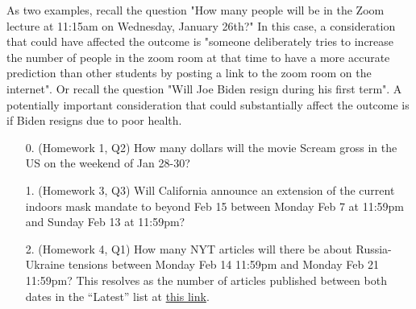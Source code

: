 \documentclass[11pt]{article}
\begin{document}
As two examples, recall the question "How many people will be in the Zoom lecture at 11:15am on Wednesday, January 26th?" In this case, a consideration that could have affected the outcome is "someone deliberately tries to increase the number of people in the zoom room at that time to have a more accurate prediction than other students by posting a link to the zoom room on the internet". Or recall the question "Will Joe Biden resign during his first term". A potentially important consideration that could substantially affect the outcome is if Biden resigns due to poor health.

\begin{enumerate}
	\item[0.] (Homework 1, Q2) How many dollars will the movie Scream gross in the US on the weekend of Jan 28-30?

	\item[1.] (Homework 3, Q3) Will California announce an extension of the current indoors mask mandate to beyond Feb 15 between Monday Feb 7 at 11:59pm and Sunday Feb 13 at 11:59pm?

	\item[2.] (Homework 4, Q1) How many NYT articles will there be about Russia-Ukraine tensions between Monday Feb 14 11:59pm and Monday Feb 21 11:59pm? This resolves as the number of articles published between both dates in the ``Latest'' list at \href{https://www.nytimes.com/news-event/ukraine-russia?name=styln-russia-ukraine&region=TOP_BANNER&block=storyline_menu_recirc&action=click&pgtype=LegacyCollection&variant=0_Control}{this link}.
\end{enumerate}
\end{document}
